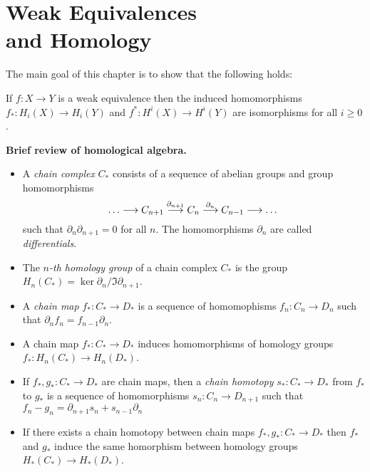

\chapter[Weak Equivalences and Homology]{Weak Equivalences \\ and Homology}
\label{WEAK EQUIVALENCES AND HOMOLOGY CHAPTER}
\thispagestyle{firststyle}

The main goal of this chapter is to show that the following holds:

\begin{theorem}
\label{WE HOMOLOGY ISO THM}
If $f\colon X\to Y$ is a weak equivalence then the induced homomorphisms 
$f_{\ast}\colon H_{i}(X) \to H_{i}(Y)$ and $f^{\ast}\colon H^{i}(X) \to H^{i}(Y)$
are isomorphisms for all $i\geq 0$. 
\end{theorem}


\begin{nn}{\bf Brief review of homological algebra.}
\begin{itemize}
\item A \emph{chain complex} $C_{\ast}$ consists of a sequence of abelian groups 
and group homomorphisms
\[
\dots \lra 
C_{n+1} \overset{\partial_{n+1}}{\lra}
C_{n} \overset{\partial_{n}}{\lra}
C_{n-1} \lra
\dots
\]
such that $\partial_{n}\partial_{n+1} = 0$ for all $n$. 
The homomorphisms $\partial_{n}$ are called \emph{differentials}.
\\[-3mm]

\item The \emph{$n$-th homology group} of a chain complex $C_{\ast}$ is the 
group $H_{n}(C_{\ast}) = \ker \partial_{n} /\Im \partial_{n+1}$. \\[-3mm]

\item A \emph{chain map} $f_{\ast}\colon C_{\ast}\to D_{\ast}$ is a sequence of 
homomophisms $f_{n}\colon C_{n}\to D_{n}$ such that 
$\partial_{n}f_{n} = f_{n-1}\partial_{n}$. \\[-3mm]

\item A chain map $f_{\ast}\colon C_{\ast}\to D_{\ast}$ induces homomorphisms 
of homology groups $f_{\ast}\colon H_{n}(C_{\ast})\to H_{n}(D_{\ast})$. \\[-2mm]

\item If $f_{\ast}, g_{\ast}\colon C_{\ast}\to D_{\ast}$ are chain maps, 
then a \emph{chain homotopy} $s_{\ast}\colon C_{\ast}\to D_{\ast}$ 
from $f_{\ast}$ to $g_{\ast}$ is a sequence of homomorphisms 
$s_{n}\colon C_{n}\to D_{n+1}$ such that 
$f_{n}-g_{n} = \partial_{n+1}s_{n} +  s_{n-1}\partial_{n}$ \\[-3mm]

\item If there exists a chain homotopy between chain maps 
$f_{\ast}, g_{\ast}\colon C_{\ast} \to D_{\ast}$ then $f_{\ast}$ and $g_{\ast}$
induce the same homorphism between homology groups 
$H_{\ast}(C_{\ast}) \to H_{\ast}(D_{\ast})$. 

\end{itemize}
\end{nn}

